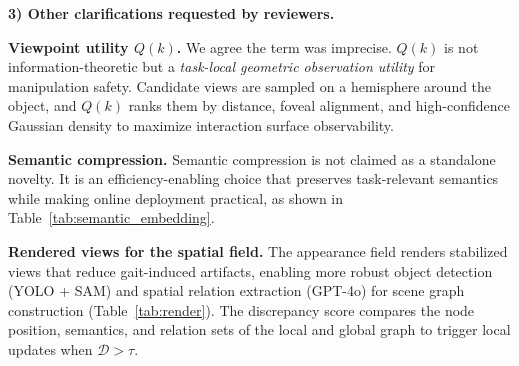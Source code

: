 \documentclass[conference]{IEEEtran}
\begin{document}
\textbf{3) Other clarifications requested by reviewers.}

\textbf{Viewpoint utility $Q(k)$.}
We agree the term was imprecise. $Q(k)$ is not information-theoretic but a \emph{task-local geometric observation utility} for manipulation safety. Candidate views are sampled on a hemisphere around the object, and $Q(k)$ ranks them by distance, foveal alignment, and high-confidence Gaussian density to maximize interaction surface observability.

\textbf{Semantic compression.}
Semantic compression is not claimed as a standalone novelty. It is an efficiency-enabling choice that preserves task-relevant semantics while making online deployment practical, as shown in Table~\ref{tab:semantic_embedding}.

\begin{table}[h]
\centering
\caption{Semantic localization under slow (S-) and fast (F-) walk conditions, memory usage, and latency.}
\label{tab:semantic_embedding}
\setlength{\tabcolsep}{3pt} %
\end{table}

\textbf{Rendered views for the spatial field.}
The appearance field renders stabilized views that reduce gait-induced artifacts, enabling more robust object detection (YOLO + SAM) and spatial relation extraction (GPT-4o) for scene graph construction (Table~\ref{tab:render}). The discrepancy score compares the node position, semantics, and relation sets of the local and global graph to trigger local updates when $\mathcal{D}>\tau$.
\end{document}
